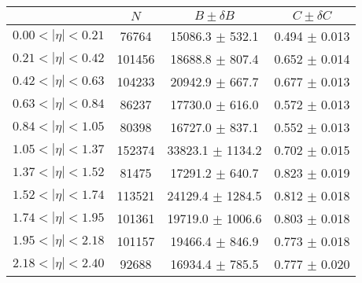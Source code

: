 \begin{tabular}{lccc}
\hline
    &   $N$   & $B \pm \delta B$  &  $C \pm \delta C$ \\
\hline
$0.00 < |\eta| <0.21$          & 76764      & 15086.3    $\pm$ 532.1 & 0.494      $\pm$ 0.013 \\
$0.21 < |\eta| <0.42$          & 101456     & 18688.8    $\pm$ 807.4 & 0.652      $\pm$ 0.014 \\
$0.42 < |\eta| <0.63$          & 104233     & 20942.9    $\pm$ 667.7 & 0.677      $\pm$ 0.013 \\
$0.63 < |\eta| <0.84$          & 86237      & 17730.0    $\pm$ 616.0 & 0.572      $\pm$ 0.013 \\
$0.84 < |\eta| <1.05$          & 80398      & 16727.0    $\pm$ 837.1 & 0.552      $\pm$ 0.013 \\
$1.05 < |\eta| <1.37$          & 152374     & 33823.1    $\pm$ 1134.2 & 0.702      $\pm$ 0.015 \\
$1.37 < |\eta| <1.52$          & 81475      & 17291.2    $\pm$ 640.7 & 0.823      $\pm$ 0.019 \\
$1.52 < |\eta| <1.74$          & 113521     & 24129.4    $\pm$ 1284.5 & 0.812      $\pm$ 0.018 \\
$1.74 < |\eta| <1.95$          & 101361     & 19719.0    $\pm$ 1006.6 & 0.803      $\pm$ 0.018 \\
$1.95 < |\eta| <2.18$          & 101157     & 19466.4    $\pm$ 846.9 & 0.773      $\pm$ 0.018 \\
$2.18 < |\eta| <2.40$          & 92688      & 16934.4    $\pm$ 785.5 & 0.777      $\pm$ 0.020 \\
\hline
\end{tabular}
